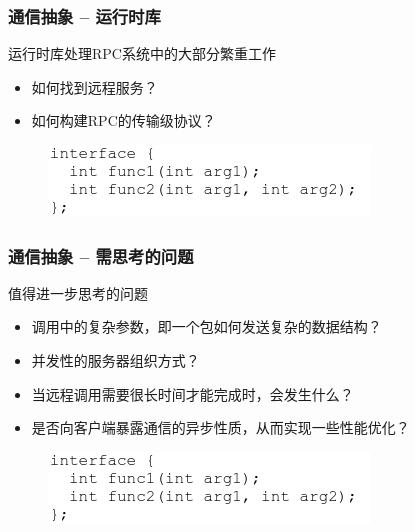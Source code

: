 \begin{frame}[fragile]
    \frametitle{通信抽象 -- 运行时库}
    运行时库处理RPC系统中的大部分繁重工作
  
    \begin{itemize}
        \item 如何找到远程服务？
        \item 如何构建RPC的传输级协议？        
    \end{itemize}
    
    \begin{figure}
        \includegraphics[width=0.6\linewidth]{figs/rpc-interface.png}
    \end{figure}
\end{frame}
\begin{frame}[fragile]
    \frametitle{通信抽象 -- 需思考的问题}
    值得进一步思考的问题
    \begin{itemize}
        \item 调用中的复杂参数，即一个包如何发送复杂的数据结构？
        \item 并发性的服务器组织方式？
        \item 当远程调用需要很长时间才能完成时，会发生什么？
        \item 是否向客户端暴露通信的异步性质，从而实现一些性能优化？
    \end{itemize}
    
    \begin{figure}
        \includegraphics[width=0.6\linewidth]{figs/rpc-interface.png}
    \end{figure}
\end{frame}

